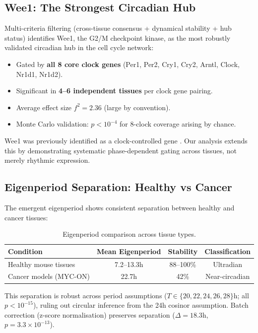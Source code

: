 \documentclass[11pt,letterpaper]{article}
\begin{document}
\subsection{Wee1: The Strongest Circadian Hub}

Multi-criteria filtering (cross-tissue consensus + dynamical stability + hub status) identifies Wee1, the G2/M checkpoint kinase, as the most robustly validated circadian hub in the cell cycle network:

\begin{itemize}
\item Gated by \textbf{all 8 core clock genes} (Per1, Per2, Cry1, Cry2, Arntl, Clock, Nr1d1, Nr1d2).
\item Significant in \textbf{4--6 independent tissues} per clock gene pairing.
\item Average effect size $f^2 = 2.36$ (large by convention).
\item Monte Carlo validation: $p < 10^{-4}$ for 8-clock coverage arising by chance.
\end{itemize}

Wee1 was previously identified as a clock-controlled gene \citep{matsuo2003control}. Our analysis extends this by demonstrating systematic phase-dependent gating across tissues, not merely rhythmic expression.

\subsection{Eigenperiod Separation: Healthy vs Cancer}

The emergent eigenperiod shows consistent separation between healthy and cancer tissues:

\begin{table}[H]
\centering
\caption{Eigenperiod comparison across tissue types.}
\label{tab:eigenperiod}
\begin{tabular}{lccc}
\toprule
\textbf{Condition} & \textbf{Mean Eigenperiod} & \textbf{Stability} & \textbf{Classification} \\
\midrule
Healthy mouse tissues & 7.2--13.3h & 88--100\% & Ultradian \\
Cancer models (MYC-ON) & 22.7h & 42\% & Near-circadian \\
\bottomrule
\end{tabular}
\end{table}

This separation is robust across period assumptions ($T \in \{20, 22, 24, 26, 28\}$h; all $p < 10^{-15}$), ruling out circular inference from the 24h cosinor assumption. Batch correction (z-score normalisation) preserves separation ($\Delta = 18.3$h, $p = 3.3 \times 10^{-13}$).
\end{document}
